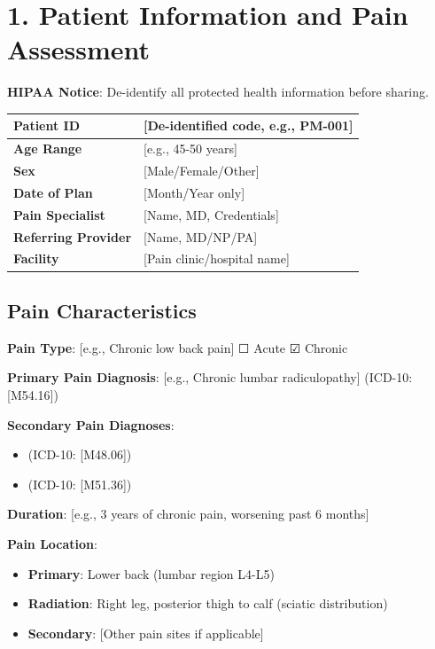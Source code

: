 \documentclass[11pt,letterpaper]{article}
\begin{document}
\section*{1. Patient Information and Pain Assessment}

\textbf{HIPAA Notice}: De-identify all protected health information before sharing.

\vspace{0.5em}

\begin{tabularx}{\textwidth}{|l|X|}
\hline
\textbf{Patient ID} & [De-identified code, e.g., PM-001] \\ \hline
\textbf{Age Range} & [e.g., 45-50 years] \\ \hline
\textbf{Sex} & [Male/Female/Other] \\ \hline
\textbf{Date of Plan} & [Month/Year only] \\ \hline
\textbf{Pain Specialist} & [Name, MD, Credentials] \\ \hline
\textbf{Referring Provider} & [Name, MD/NP/PA] \\ \hline
\textbf{Facility} & [Pain clinic/hospital name] \\ \hline
\end{tabularx}

\vspace{1em}

\subsection*{Pain Characteristics}

\textbf{Pain Type}: [e.g., Chronic low back pain] ☐ Acute ☑ Chronic

\textbf{Primary Pain Diagnosis}: [e.g., Chronic lumbar radiculopathy] (ICD-10: [M54.16])

\textbf{Secondary Pain Diagnoses}:
\begin{itemize}[leftmargin=*]
    \item [e.g., Lumbar spinal stenosis] (ICD-10: [M48.06])
    \item [e.g., Degenerative disc disease L4-L5] (ICD-10: [M51.36])
\end{itemize}

\textbf{Duration}: [e.g., 3 years of chronic pain, worsening past 6 months]

\textbf{Pain Location}:
\begin{itemize}[leftmargin=*]
    \item \textbf{Primary}: Lower back (lumbar region L4-L5)
    \item \textbf{Radiation}: Right leg, posterior thigh to calf (sciatic distribution)
    \item \textbf{Secondary}: [Other pain sites if applicable]
\end{itemize}
\end{document}
